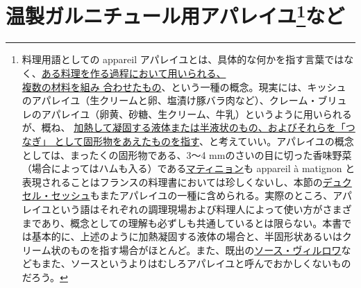 \href{未、原文対照チェック}{} \href{未、日本語表現校正}{}
\href{未、その他修正}{} \href{未、原稿最終校正}{}

\hypertarget{serie-des-appareiles-et-preparations-diverses-pour-garnitures-chaudes}{%
\section[温製ガルニチュール用アパレイユなど]{\texorpdfstring{温製ガルニチュール用アパレイユ\footnote{料理用語としての
  appareil
  アパレイユとは、具体的な何かを指す言葉ではなく、\ul{ある料理を作る過程において用いられる、\\複数の材料を組み
  合わせたもの}、という一種の概念。現実には、キッシュのアパレイユ（生クリームと卵、塩漬け豚バラ肉など）、クレーム・ブリュレのアパレイユ（卵黄、砂糖、生クリーム、牛乳）というように用いられるが、概ね、
  \ul{加熱して凝固する液体または半液状のもの、およびそれらを「つなぎ」
  として固形物をあえたものを指す}、と考えていい。アパレイユの概念としては、まったくの固形物である、3〜4
  mmのさいの目に切った香味野菜（場合によってはハムも入る）である\protect\hyperlink{matignon}{マティニョン}も
  appareil à matignon
  と表現されることはフランスの料理書においては珍しくないし、本節の\protect\hyperlink{duxelles-seche}{デュクセル・セッシュ}もまたアパレイユの一種に含められる。実際のところ、アパレイユという語はそれぞれの調理現場および料理人によって使い方がさまざまであり、概念としての理解も必ずしも共通しているとは限らない。本書では基本的に、上述のように加熱凝固する液体の場合と、半固形状あるいはクリーム状のものを指す場合がほとんど。また、既出の\protect\hyperlink{sauce-villeroy}{ソース・ヴィルロワ}などもまた、ソースというよりはむしろアパレイユと呼んでおかしくないものだろう。}など}{温製ガルニチュール用アパレイユなど}}\label{serie-des-appareiles-et-preparations-diverses-pour-garnitures-chaudes}}


